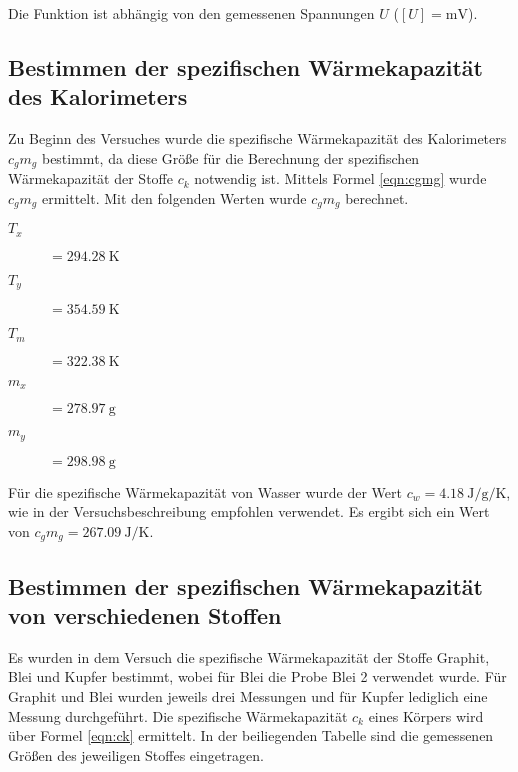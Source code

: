 Die Funktion ist abhängig von den gemessenen Spannungen $U$ ($[U] = \si{\milli\volt}$).

\subsection{Bestimmen der spezifischen Wärmekapazität des Kalorimeters}

Zu Beginn des Versuches wurde die spezifische Wärmekapazität des Kalorimeters
$c_gm_g$ bestimmt, da diese Größe für die Berechnung der spezifischen
Wärmekapazität der Stoffe $c_k$ notwendig ist. Mittels Formel \eqref{eqn:cgmg} wurde
$c_gm_g$ ermittelt. Mit den folgenden Werten wurde $c_gm_g$ berechnet.

\begin{description}
  \item[$T_x$]$ = \SI{294,28}{\kelvin}$
  \item[$T_y$]$ = \SI{354,59}{\kelvin}$
  \item[$T_m$]$ = \SI{322,38}{\kelvin}$
  \item[$m_x$]$ = \SI{278,97}{\gram}$
  \item[$m_y$]$ = \SI{298,98}{\gram}$
\end{description}

Für die spezifische Wärmekapazität von Wasser wurde der Wert $c_w =
\SI{4,18}{\joule\per\gram\per\kelvin}$, wie in der Versuchsbeschreibung
\cite{anleitung} empfohlen verwendet.
Es ergibt sich ein Wert von $c_gm_g = \SI{267,09}{\joule\per\kelvin}$.

\subsection{Bestimmen der spezifischen Wärmekapazität von verschiedenen Stoffen}

Es wurden in dem Versuch die spezifische Wärmekapazität der Stoffe Graphit,
Blei und Kupfer bestimmt, wobei für Blei die Probe Blei 2 verwendet wurde.
Für Graphit und Blei wurden jeweils drei Messungen und für Kupfer lediglich eine
Messung durchgeführt. Die spezifische Wärmekapazität $c_k$ eines Körpers
wird über Formel \eqref{eqn:ck} ermittelt. In der beiliegenden Tabelle sind die gemessenen
Größen des jeweiligen Stoffes eingetragen.

